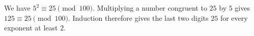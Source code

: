 We have $5^2\equiv25\pmod{100}$. Multiplying a number congruent to $25$ by $5$ gives $125\equiv25\pmod{100}$. Induction therefore gives the last two digits $\boxed{25}$ for every exponent at least $2$.
